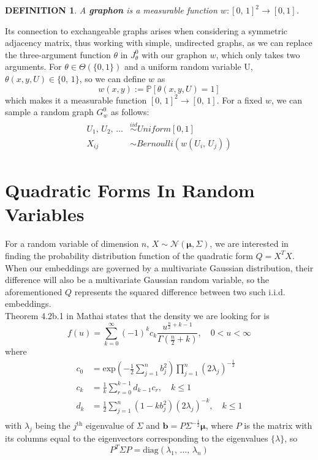 \documentclass[12pt]{report}
\newtheorem{definition}[theorem]{DEFINITION}
\newcommand{\bs}{\boldsymbol}
\newcommand{\mc}[1]{\mathcal{#1}}
\newcommand{\mb}[1]{\mathbb{#1}}
\newcommand{\half}{\frac{1}{2}}
\newcommand{\sumlim}[3]{\sum\limits_{#1 = #2}^{#3}}
\newcommand{\prodlim}[3]{\prod\limits_{#1 = #2}^{#3}}
\renewcommand{\bs}{\boldsymbol}
\begin{document}
\begin{definition}
    A \textbf{graphon} is a measurable function $w : [0,\,1]^2 \rightarrow [0, 1]$.
\end{definition}

Its connection to exchangeable graphs arises when considering a symmetric adjacency matrix, thus working with simple, undirected graphs, as we can replace the three-argument function $\theta$ in $J_\theta^0$ with our graphon $w$, which only takes two arguments. For $\theta \in \Theta(\{0, 1\})$ and a uniform random variable U, $\theta(x, y, U) \in \{0,\,1\}$, so we can define $w$ as
\begin{equation}
    w(x, y) := \mb{P}[\theta(x, y, U) = 1]
\end{equation}
which makes it a measurable function $[0,\,1]^2 \rightarrow [0,\,1]$. For a fixed $w$, we can sample a random graph $G_w^0$ as follows:
\begin{align}
\begin{split}
    U_1,\,U_2,\,\dots &\overset{iid}{\sim} Uniform[0, 1] \\
    X_{ij} &\sim Bernoulli(w(U_i,\,U_j))
\end{split}
\end{align}

\section{Quadratic Forms In Random Variables}
For a random variable of dimension $n$, $X \sim \mc{N}(\bs{\mu}, \Sigma)$, we are interested in finding the probability distribution function of the quadratic form $Q = X^TX$. When our embeddings are governed by a multivariate Gaussian distribution, their difference will also be a multivariate Gaussian random variable, so the aforementioned $Q$ represents the squared difference between two such i.i.d. embeddings. \\

Theorem 4.2b.1 in Mathai states that the density we are looking for is
\begin{equation}
    f(u) = \sumlim{k}{0}{\infty}(-1)^kc_k\frac{u^{\frac{n}{2} + k - 1}}{\Gamma(\frac{n}{2} + k)},\quad 0 < u < \infty
\end{equation}
where
\begin{align}
    c_0 &= \text{exp}\left(-\half\sumlim{j}{1}{n}b_j^2\right)\prodlim{j}{1}{n}(2\lambda_j)^{-\half} \\
    c_k &= \frac{1}{k}\sumlim{r}{0}{k - 1}d_{k-1}c_r,\quad k \leq 1 \\
    d_k &= \half\sumlim{j}{1}{n}(1 - kb_j^2)(2\lambda_j)^{-k},\quad k \leq 1 \\
\end{align}
with $\lambda_j$ being the $j^\text{th}$ eigenvalue of $\Sigma$ and $\bs{b} = P\Sigma^{-\half}\bs{\mu}$, where $P$ is the matrix with its columns equal to the eigenvectors corresponding to the eigenvalues $\{\lambda\}$, so
\begin{equation}
    P^T\Sigma P = \text{diag}(\lambda_1,\,\dots,\,\lambda_n)
\end{equation}
\end{document}
